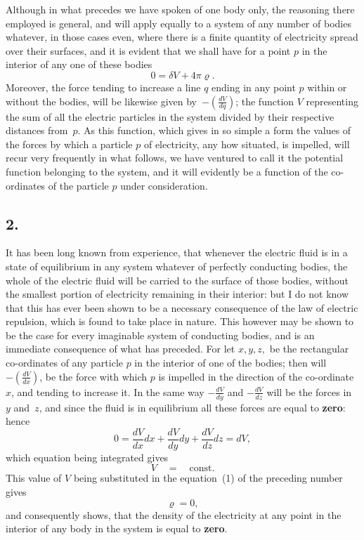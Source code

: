 \documentclass[11pt,notitlepage]{amsart}
\let\Emphasis\textbf
\newcommand\Section[1]{\subsection{{#1}}}
\renewcommand{\rho}{\varrho}
\begin{document}
Although in what precedes we have spoken of one body only, the
reasoning there employed is general, and will apply equally to a system of
any number of bodies whatever, in those cases even, where there is a finite
quantity of electricity spread over their surfaces, and it is evident that we
shall have for a point $p$ in the interior of any one of these bodies
\[
\tag{1.}
0=\delta V+4\pi\rho.
\]
Moreover, the force tending to increase a line $q$
ending in any point $p$ within
or without the bodies, will be likewise given
by~$-(\frac{dV}{dq})$; the function $V$
representing the sum of all the electric particles in the system divided by
their respective distances from~$p$. As this function, which gives in so simple
a form the values of the forces by which a particle $p$ of electricity, any how
situated, is impelled, will recur very frequently in what follows, we have
ventured to call it the potential function belonging to the system, and it will
evidently be a function of the co-ordinates of the particle $p$ under consideration.
\bigskip

\Section{2.}
It has been long known from experience, that whenever the electric
fluid is in a state of equilibrium in any system whatever of perfectly 
conducting bodies, the whole of the electric fluid
will be carried to the surface
of those bodies, without the smallest portion of electricity remaining in their
interior: but I do not know that this has ever been shown to be a necessary
consequence of the law of electric repulsion, which is found to take place in
nature. This however may be shown to be the case for every imaginable
system of conducting bodies, and is an immediate consequence of what has
preceded. For let $x,y,z,$ be the rectangular co-ordinates of any particle $p$
in the interior of one of the bodies; then will
$-(\frac{dV}{dx})$, be the force with
which $p$ is impelled in the direction of the co-ordinate~$x$,
and tending to
increase it. In the same way $-\frac{dV}{dy}$ and $-\frac{dV}{dz}$
will be the forces in~$y$ and~$z$,
and since the fluid is in equilibrium all these forces are equal to
\Emphasis{zero}: hence
\[
0=\frac{dV}{dx}dx+\frac{dV}{dy}dy+\frac{dV}{dz}dz=dV,
\]
which equation being integrated gives
\[
V \quad=\quad \text{const.}
\]
This value of $V$ being substituted in the equation~(1) of the preceding
number gives
\[
\rho = 0,
\]
and consequently shows, that the density of the electricity at any point in the
interior of any body in the system is equal to \Emphasis{zero}.
\end{document}
